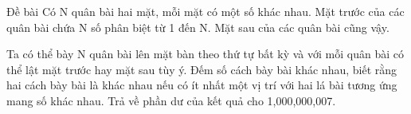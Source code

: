 Đề bài
Có N quân bài hai mặt, mỗi mặt có một số khác nhau. Mặt trước của các quân bài chứa N số phân biệt từ 1 đến N. Mặt sau của các quân bài cũng vậy.  

   Ta có thể bày N quân bài lên mặt bàn theo thứ tự bất kỳ và với mỗi quân bài có thể lật mặt trước hay mặt sau tùy ý. Đếm số cách bày bài khác nhau, biết rằng hai cách bày bài là khác nhau nếu có ít nhất một vị trí với hai lá bài tương ứng mang số khác nhau. Trả về phần dư của kết quả cho 1,000,000,007.